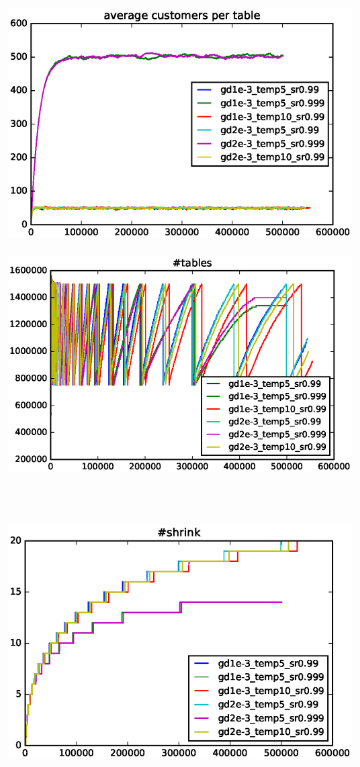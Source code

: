 \begin{figure}[h]
  \centering
  \begin{subfigure}{0.49\textwidth}
    \centering
    \includegraphics[width = \textwidth]{plans/eps/0_1_2_3_4_5_cnum_avg.eps}
    \caption{}
    \label{fig::plans_a}
  \end{subfigure}
  \begin{subfigure}{0.49\textwidth}
    \centering
    \includegraphics[width = \textwidth]{plans/eps/0_1_2_3_4_5_rest_num.eps}
    \caption{}
    \label{fig::plans_b}
  \end{subfigure}
  \\
  \begin{subfigure}{0.49\textwidth}
    \centering
    \includegraphics[width = \textwidth]{plans/eps/0_1_2_3_4_5_reduce_cnt.eps}

\end{subfigure}
\end{figure}
